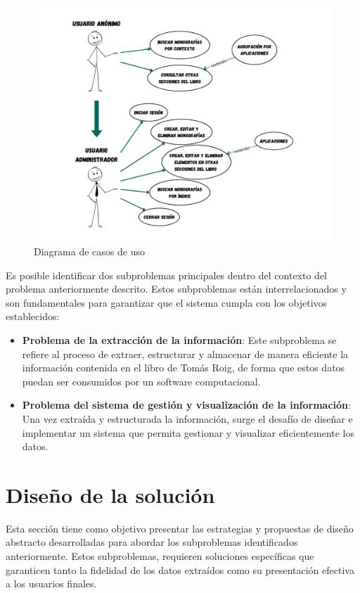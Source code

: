 \begin{figure}[ht!]
    \centering
    \includegraphics[width=1\textwidth]{Images/use-cases.png}
    \caption{Diagrama de casos de uso}
    \label{fig:use-cases}
\end{figure}

Es posible identificar dos subproblemas principales dentro del contexto del problema anteriormente descrito. 
Estos subproblemas están interrelacionados y son fundamentales para garantizar que el sistema cumpla 
con los objetivos establecidos:

\begin{itemize}
    \item \textbf{Problema de la extracción de la información}: Este subproblema se refiere al proceso 
    de extraer, estructurar y almacenar de manera eficiente la información contenida en el libro de Tomás Roig, 
    de forma que estos datos puedan ser consumidos por un software computacional.
    \item \textbf{Problema del sistema de gestión y visualización de la información}: Una vez 
    extraída y estructurada la información, surge el desafío de diseñar e implementar un sistema que permita 
    gestionar y visualizar eficientemente los datos.
\end{itemize}




\newpage 
\section{Diseño de la solución}
Esta sección tiene como objetivo presentar las estrategias y propuestas de diseño abstracto desarrolladas 
para abordar los subproblemas identificados anteriormente. 
Estos subproblemas, requieren soluciones específicas que garanticen tanto 
la fidelidad de los datos extraídos como su presentación efectiva a los usuarios finales.


